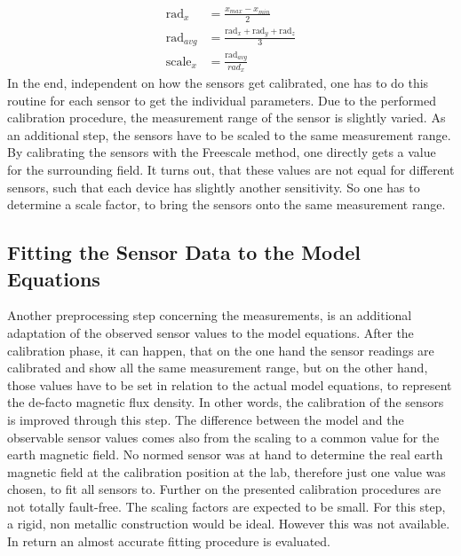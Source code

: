 \begin{equation} \label{eq:simpleScale}
\begin{aligned}
\mathrm{rad}_{x} &= \frac{x_{max} - x_{min}}{2}\\
\mathrm{rad}_{avg} &= \frac{\mathrm{rad}_{x} + \mathrm{rad}_{y} + \mathrm{rad}_{z}}{3}\\
\mathrm{scale}_{x} &= \frac{\mathrm{rad}_{avg}}{rad_{x}}
\end{aligned}
\end{equation}
In the end, independent on how the sensors get calibrated, one has to do this routine for each sensor to get the individual parameters. Due to the performed calibration procedure, the measurement range of the sensor is slightly varied. As an additional step, the sensors have to be scaled to the same measurement range. By calibrating the sensors with the Freescale method, one directly gets a value for the surrounding field. It turns out, that these values are not equal for different sensors, such that each device has slightly another sensitivity. So one has to determine a scale factor, to bring the sensors onto the same measurement range.


\subsection{Fitting the Sensor Data to the Model Equations} \label{subsec:modelFit}
Another preprocessing step concerning the measurements, is an additional adaptation of the observed sensor values to the model equations. After the calibration phase, it can happen, that on the one hand the sensor readings are calibrated and show all the same measurement range, but on the other hand, those values have to be set in relation to the actual model equations, to represent the de-facto magnetic flux density. In other words, the calibration of the sensors is improved through this step. The difference between the model and the observable sensor values comes also from the scaling to a common value for the earth magnetic field. No normed sensor was at hand to determine the real earth magnetic field at the calibration position at the lab, therefore just one value was chosen, to fit all sensors to. Further on the presented calibration procedures are not totally fault-free. The scaling factors are expected to be small. For this step, a rigid, non metallic construction would be ideal. However this was not available. In return an almost accurate fitting procedure is evaluated.

